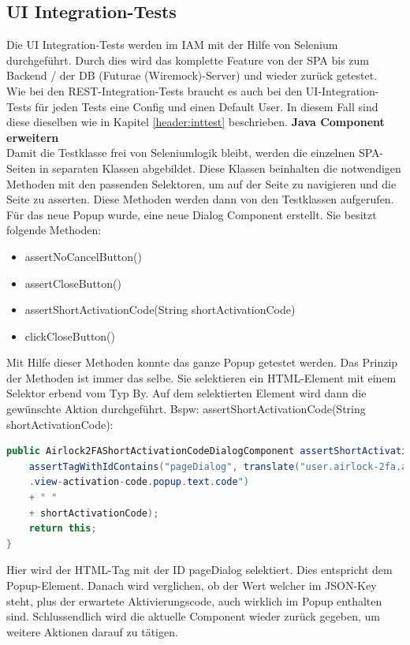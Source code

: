 \subsection{UI Integration-Tests}
Die UI Integration-Tests werden im IAM mit der Hilfe von Selenium durchgeführt. Durch dies wird das komplette Feature von der SPA bis zum Backend / der DB (Futurae (Wiremock)-Server) und wieder zurück getestet. \\
Wie bei den REST-Integration-Tests braucht es auch bei den UI-Integration-Tests für jeden Tests eine Config und einen Default User. In diesem Fall sind diese dieselben wie in Kapitel \ref{header:inttest} beschrieben.
\newpage
\noindent \textbf{Java Component erweitern}\\
Damit die Testklasse frei von Seleniumlogik bleibt, werden die einzelnen SPA-Seiten in separaten Klassen abgebildet. Diese Klassen beinhalten die notwendigen Methoden mit den passenden Selektoren, um auf der Seite zu navigieren und die Seite zu asserten. Diese Methoden werden dann von den Testklassen aufgerufen. Für das neue Popup wurde, eine neue Dialog Component erstellt. Sie besitzt folgende Methoden:
\begin{itemize}
	\item assertNoCancelButton()
	\item assertCloseButton()
	\item assertShortActivationCode(String shortActivationCode)
	\item clickCloseButton()
\end{itemize}
Mit Hilfe dieser Methoden konnte das ganze Popup getestet werden. Das Prinzip der Methoden ist immer das selbe. Sie selektieren ein HTML-Element mit einem Selektor erbend vom Typ \flqq By\frqq{}. Auf dem selektierten Element wird dann die gewünschte Aktion durchgeführt. Bspw: assertShortActivationCode(String shortActivationCode):
\begin{lstlisting}[language=Java]
public Airlock2FAShortActivationCodeDialogComponent assertShortActivationCode (String shortActivationCode) {
	assertTagWithIdContains("pageDialog", translate("user.airlock-2fa.activation
	.view-activation-code.popup.text.code") 
	+ " " 
	+ shortActivationCode);
	return this;
}
\end{lstlisting}
Hier wird der HTML-Tag mit der ID \flqq pageDialog\frqq{} selektiert. Dies entspricht dem Popup-Element. Danach wird verglichen, ob der Wert welcher im JSON-Key steht, plus der erwartete Aktivierungscode, auch wirklich im Popup enthalten sind. Schlussendlich wird die aktuelle Component wieder zurück gegeben, um weitere Aktionen darauf zu tätigen.
